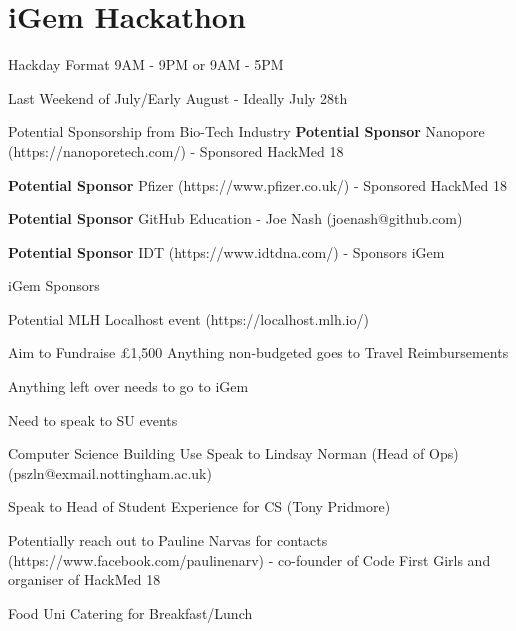 \documentclass[11pt,hacksoc]{meetingmins}
\begin{document}
\maketitle

\section{iGem Hackathon}
\begin{items}
	\item
	Hackday Format
		\subitem
		9AM - 9PM or 9AM - 5PM
		
	\item
	Last Weekend of July/Early August - Ideally July 28th
	
	\item
	Potential Sponsorship from Bio-Tech Industry
		\subitem
		\textbf{Potential Sponsor} Nanopore (https://nanoporetech.com/) - Sponsored HackMed 18
		
		\subitem
		\textbf{Potential Sponsor} Pfizer (https://www.pfizer.co.uk/) - Sponsored HackMed 18
		
		\subitem
		\textbf{Potential Sponsor} GitHub Education - Joe Nash (joenash@github.com)
		
		\subitem
		\textbf{Potential Sponsor} IDT (https://www.idtdna.com/) - Sponsors iGem
		
		\subitem
		iGem Sponsors
	
	\item
	Potential MLH Localhost event (https://localhost.mlh.io/)
	
	\item
	Aim to Fundraise \pounds1,500
		\subitem
		Anything non-budgeted goes to Travel Reimbursements
		
		\subitem
		Anything left over needs to go to iGem
	
	\item
	Need to speak to SU events
	
	\item
	Computer Science Building Use
		\subitem
		Speak to Lindsay Norman (Head of Ops) (pszln@exmail.nottingham.ac.uk)
		
		\subitem
		Speak to Head of Student Experience for CS (Tony Pridmore)
	
	\item
	Potentially reach out to Pauline Narvas for contacts (https://www.facebook.com/paulinenarv) - co-founder of Code First Girls and organiser of HackMed 18
	
	\item
	Food
		\subsubitem
		Uni Catering for Breakfast/Lunch
		

\end{items}
\end{document}
